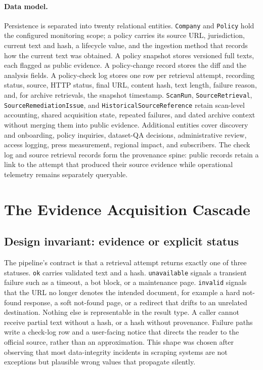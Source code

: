 \documentclass[11pt]{article}
\begin{document}
\paragraph{Data model.}
Persistence is separated into twenty relational entities. \texttt{Company} and \texttt{Policy} hold
the configured monitoring scope; a policy carries its source URL, jurisdiction,
current text and hash, a lifecycle value, and the ingestion method that records
how the current text was obtained. A policy snapshot stores versioned full texts,
each flagged as public evidence. A policy-change record stores the diff and the
analysis fields. A policy-check log stores one row per retrieval attempt,
recording status, source, HTTP status, final URL, content hash, text length,
failure reason, and, for archive retrievals, the snapshot timestamp.
\texttt{ScanRun}, \texttt{SourceRetrieval}, \texttt{SourceRemediationIssue}, and
\texttt{HistoricalSourceReference} retain scan-level accounting, shared
acquisition state, repeated failures, and dated archive context without merging
them into public evidence. Additional entities cover discovery and onboarding,
policy inquiries, dataset-QA decisions, administrative review, access logging,
press measurement, regional impact, and subscribers. The check log and source
retrieval records form the provenance spine: public records retain a link to the
attempt that produced their source evidence while operational telemetry remains
separately queryable.

\section{The Evidence Acquisition Cascade}
\label{sec:pipeline}

\subsection{Design invariant: evidence or explicit status}
The pipeline's contract is that a retrieval attempt returns exactly one of three
statuses. \texttt{ok} carries validated text and a hash. \texttt{unavailable}
signals a transient failure such as a timeout, a bot block, or a maintenance
page. \texttt{invalid} signals that the URL no longer denotes the intended
document, for example a hard not-found response, a soft not-found page, or a
redirect that drifts to an unrelated destination. Nothing else is
representable in the result type. A caller cannot receive partial text without a
hash, or a hash without provenance. Failure paths write a check-log row and a
user-facing notice that directs the reader to the official source, rather than
an approximation. This shape was chosen after observing that most data-integrity
incidents in scraping systems are not exceptions but plausible wrong values that
propagate silently.
\end{document}
